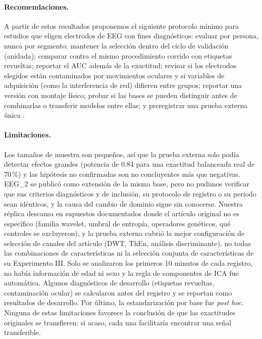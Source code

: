 \paragraph{Recomendaciones.} A partir de estos resultados proponemos el siguiente protocolo mínimo para estudios que eligen electrodos de EEG con fines diagnósticos: evaluar por persona, nunca por segmento; mantener la selección dentro del ciclo de validación (anidada); comparar contra el mismo procedimiento corrido con etiquetas revueltas; reportar el AUC además de la exactitud; revisar si los electrodos elegidos están contaminados por movimientos oculares y si variables de adquisición (como la interferencia de red) difieren entre grupos; reportar una versión con montaje físico; probar si las bases se pueden distinguir antes de combinarlas o transferir modelos entre ellas; y preregistrar una prueba externa única \citep{nosek2018,collins2024}.

\paragraph{Limitaciones.} Los tamaños de muestra son pequeños, así que la prueba externa solo podía detectar efectos grandes (potencia de 0.84 para una exactitud balanceada real de 70\,\%) y las hipótesis no confirmadas son no concluyentes más que negativas. EEG\_2 se publicó como extensión de la misma base, pero no pudimos verificar que sus criterios diagnósticos y de inclusión, su protocolo de registro o su periodo sean idénticos, y la causa del cambio de dominio sigue sin conocerse. Nuestra réplica descansa en supuestos documentados donde el artículo original no es específico (familia wavelet, umbral de entropía, operadores genéticos, qué controles se excluyeron), y la prueba externa cubrió la mejor configuración de selección de canales del artículo (DWT, ThEn, análisis discriminante), no todas las combinaciones de características ni la selección conjunta de características de su Experimento III. Solo se analizaron los primeros 10 minutos de cada registro, no había información de edad ni sexo y la regla de componentes de ICA fue automática. Algunos diagnósticos de desarrollo (etiquetas revueltas, contaminación ocular) se calcularon antes del registro y se reportan como resultados de desarrollo. Por último, la estandarización por base fue \emph{post hoc}. Ninguna de estas limitaciones favorece la conclusión de que las exactitudes originales se transfieren: si acaso, cada una facilitaría encontrar una señal transferible.

